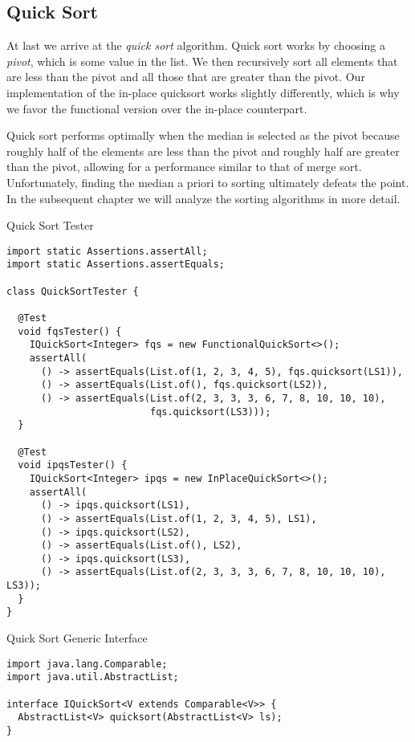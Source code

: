 \subsection{Quick Sort}
At last we arrive at the \emph{quick sort} algorithm. Quick sort works by choosing a \emph{pivot}, which is some value in the list. We then recursively sort all elements that are less than the pivot and all those that are greater than the pivot. Our implementation of the in-place quicksort works slightly differently, which is why we favor the functional version over the in-place counterpart. 

Quick sort performs optimally when the median is selected as the pivot because roughly half of the elements are less than the pivot and roughly half are greater than the pivot, allowing for a performance similar to that of merge sort. Unfortunately, finding the median a priori to sorting ultimately defeats the point. In the subsequent chapter we will analyze the sorting algorithms in more detail.

\begin{cl}[]{Quick Sort Tester}
\begin{lstlisting}[language=MyJava]
import static Assertions.assertAll;
import static Assertions.assertEquals;

class QuickSortTester {

  @Test
  void fqsTester() {
    IQuickSort<Integer> fqs = new FunctionalQuickSort<>();
    assertAll(
      () -> assertEquals(List.of(1, 2, 3, 4, 5), fqs.quicksort(LS1)),
      () -> assertEquals(List.of(), fqs.quicksort(LS2)),
      () -> assertEquals(List.of(2, 3, 3, 3, 6, 7, 8, 10, 10, 10), 
                         fqs.quicksort(LS3)));
  }

  @Test
  void ipqsTester() {
    IQuickSort<Integer> ipqs = new InPlaceQuickSort<>();
    assertAll(
      () -> ipqs.quicksort(LS1),
      () -> assertEquals(List.of(1, 2, 3, 4, 5), LS1),
      () -> ipqs.quicksort(LS2),
      () -> assertEquals(List.of(), LS2),
      () -> ipqs.quicksort(LS3),
      () -> assertEquals(List.of(2, 3, 3, 3, 6, 7, 8, 10, 10, 10), LS3));
  }
}
\end{lstlisting}
\end{cl}

\begin{cl}[]{Quick Sort Generic Interface}
\begin{lstlisting}[language=MyJava]
import java.lang.Comparable;
import java.util.AbstractList;

interface IQuickSort<V extends Comparable<V>> {
  AbstractList<V> quicksort(AbstractList<V> ls);
}
\end{lstlisting}
\end{cl}

